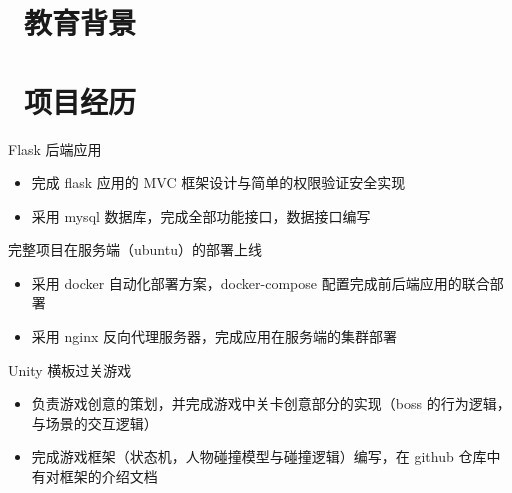 \documentclass{resume}
\begin{document}



 
\section{\faGraduationCap\  教育背景}

\section{\faUsers\ 项目经历}

\begin{onehalfspacing}
Flask 后端应用
\begin{itemize}
  \item 完成 flask 应用的 MVC 框架设计与简单的权限验证安全实现
  \item 采用 mysql 数据库，完成全部功能接口，数据接口编写
\end{itemize}
完整项目在服务端（ubuntu）的部署上线
\begin{itemize}
  \item 采用 docker 自动化部署方案，docker-compose 配置完成前后端应用的联合部署
  \item 采用 nginx 反向代理服务器，完成应用在服务端的集群部署
\end{itemize}
\end{onehalfspacing}

\begin{onehalfspacing}
Unity 横板过关游戏
\begin{itemize}
  \item 负责游戏创意的策划，并完成游戏中关卡创意部分的实现（boss 的行为逻辑，与场景的交互逻辑）
  \item 完成游戏框架（状态机，人物碰撞模型与碰撞逻辑）编写，在 github 仓库中有对框架的介绍文档
\end{itemize}
\end{onehalfspacing}
\end{document}
